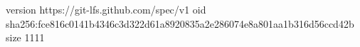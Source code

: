 version https://git-lfs.github.com/spec/v1
oid sha256:fce816c0141b4346c3d322d61a8920835a2e286074e8a801aa1b316d56ccd42b
size 1111
